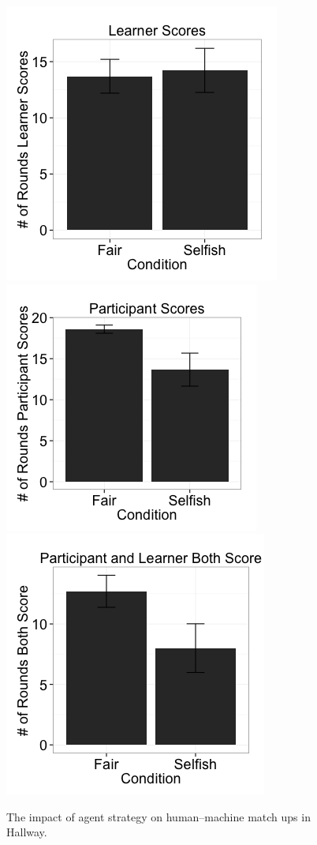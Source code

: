\documentclass[letterpaper]{article}
\begin{document}
\begin{figure}
\centering
\includegraphics[width=0.6\columnwidth]{figures/learnergoals.png}
\includegraphics[width=0.6\columnwidth]{figures/humangoals.png}
\includegraphics[width=0.6\columnwidth]{figures/bothgoals.png}
\caption{The impact of agent strategy on human--machine match ups in Hallway.}
\label{f:people}
\end{figure}
\end{document}
